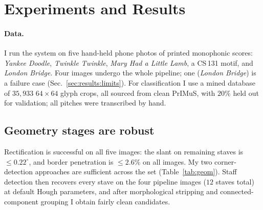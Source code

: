 \section{Experiments and Results}
\label{sec:results}

\paragraph{Data.} I run the system on five hand-held phone photos of printed
monophonic scores: \emph{Yankee Doodle}, \emph{Twinkle Twinkle}, \emph{Mary Had
a Little Lamb}, a CS\,131 motif, and \emph{London Bridge}. Four images undergo
the whole pipeline; one (\emph{London Bridge}) is a failure case
(Sec.~\ref{sec:results:limits}). For classification I use a mined database of
$35{,}933$ $64\times64$ glyph crops, all sourced from clean PrIMuS, with $20\%$
held out for validation; all pitches were transcribed by hand.

\subsection{Geometry stages are robust}
\label{sec:results:geometry}
Rectification is successful on all five images: the slant on remaining staves is
$\le 0.22^{\circ}$, and border penetration is $\le 2.6\%$ on all images. My two
corner-detection approaches are sufficient across the set (Table~\ref{tab:geom}).
Staff detection then recovers every stave on the four pipeline images ($12$
staves total) at default Hough parameters, and after morphological stripping and
connected-component grouping I obtain fairly clean candidates.

\begin{table}[t]
  \centering
  \small
  \setlength{\tabcolsep}{4pt}
  \caption{Geometry front end. Residual slant, border intrusion, detected staves,
  and segmented symbol candidates. All staves are recovered at default parameters.}
  \label{tab:geom}
\end{table}

